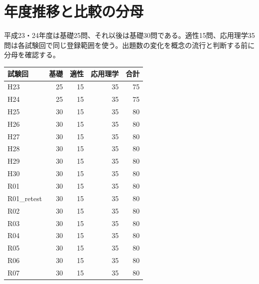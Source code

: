 \chapter{年度推移と比較の分母}
平成23・24年度は基礎25問、それ以後は基礎30問である。適性15問、応用理学35問は各試験回で同じ登録範囲を使う。出題数の変化を概念の流行と判断する前に分母を確認する。
\begin{longtable}{lrrrr}
試験回 & 基礎 & 適性 & 応用理学 & 合計\\\hline
H23 & 25 & 15 & 35 & 75\\
H24 & 25 & 15 & 35 & 75\\
H25 & 30 & 15 & 35 & 80\\
H26 & 30 & 15 & 35 & 80\\
H27 & 30 & 15 & 35 & 80\\
H28 & 30 & 15 & 35 & 80\\
H29 & 30 & 15 & 35 & 80\\
H30 & 30 & 15 & 35 & 80\\
R01 & 30 & 15 & 35 & 80\\
R01\_retest & 30 & 15 & 35 & 80\\
R02 & 30 & 15 & 35 & 80\\
R03 & 30 & 15 & 35 & 80\\
R04 & 30 & 15 & 35 & 80\\
R05 & 30 & 15 & 35 & 80\\
R06 & 30 & 15 & 35 & 80\\
R07 & 30 & 15 & 35 & 80\\
\end{longtable}
